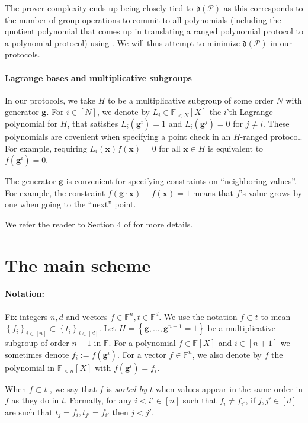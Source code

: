 \documentclass[11pt]{article} %
\newcommand{\F}{\ensuremath{\mathbb F}\xspace}
\newcommand{\defeq}{:=}
\newcommand{\dom}{\ensuremath{H}\xspace}
\newcommand{\sett}[2]{\ensuremath{\set{#1}_{#2}}\xspace}
\newcommand{\set}[1]{\ensuremath{\left\{#1\right\}}\xspace}
\newcommand{\hgen}{\ensuremath{\mathbf{g}}\xspace}
\newcommand{\cosetgen}{\ensuremath{\mathbf{\kappa}}\xspace}
\newcommand{\polysofdeg}[1]{\ensuremath{\F_{< #1}[X]}\xspace}
\newcommand{\polyss}{\ensuremath{\F[X]}\xspace}
\newcommand{\prot}{\ensuremath{\mathscr{P}}\xspace}
\newcommand{\aggdeg}[1]{\ensuremath{\mathfrak{d}(#1)}\xspace}
\newcommand{\X}{\ensuremath{ {\mathbf{x}}}\xspace}
\begin{document}
The prover complexity ends up being closely tied to \aggdeg{\prot} as this corresponds to the number of group operations to commit to all polynomials (including the quotient polynomial that comes up in translating a ranged polynomial protocol to a polynomial protocol) using \cite{kate}. We will thus attempt to minimize \aggdeg{\prot} in our protocols.

 
 \paragraph{Lagrange bases and multiplicative subgroups}
 In our protocols, we take $H$ to be a multiplicative subgroup of some order $N$ with generator \hgen.
 For $i\in [N]$, we denote by $L_i\in \polysofdeg{N}$ the $i$'th Lagrange polynomial for $H$, that satisfies $L_i(\hgen^i)=1$ and $L_i(\hgen^j)=0$ for $j\neq i$.
 These polynomials are covenient when specifying a point check in an $H$-ranged protocol.
 For example, requiring $L_i(\X)f(\X)=0$ for all $\X\in H$ is equivalent to 
 $f(\hgen^i)=0$.
 
 The generator \hgen is convenient for specifying constraints on ``neighboring values''.
 For example, the constraint 
 $f(\hgen\cdot \X)- f(\X) =1$
 means that $f$'s value grows by one when going to the ``next'' point.
 




We refer the reader to Section 4 of \cite{plonk} for more details.
 

\section{The main scheme}\label{sec:mainscheme}


\paragraph{Notation:}

Fix integers $n,d$ and vectors $f\in \F^n, t\in\F^d$.
We use the notation $f\subset t$ to mean $\sett{f_i}{i\in [n]}\subset \sett{t_i}{i\in [d]}$. Let $\dom=\set{\hgen,\ldots,\hgen^{n+1}=1}$ be a multiplicative subgroup of order $n+1$ in \F.
For a polynomial $f\in \polyss$ and $i\in [n+1]$ we sometimes denote $f_i\defeq f(\hgen^i)$.
For a vector $f\in \F^n$, we also denote by $f$ the polynomial in \polysofdeg{n} with $f(\hgen^i) =f_i$.


When $f\subset t$ , we say that $f$ is \emph{sorted by $t$} when values appear in the same order in $f$ as they do in $t$. Formally, for any $i<i'\in [n]$ such that $f_i\neq f_{i'}$, if $j,j'\in [d]$ are such that $t_{j} = f_i, t_{j'} =f_{i'}$ then $j<j'$.
\end{document}
